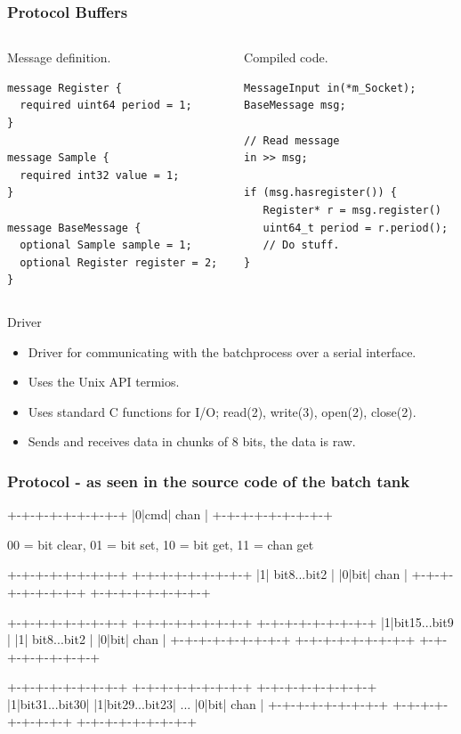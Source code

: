 \documentclass{beamer}
\begin{document}
\begin{frame}[fragile]
\frametitle{Protocol Buffers}
\begin{columns}
    \begin{column}{.5\textwidth}
    \normalsize
    Message definition.
    \footnotesize
    \begin{verbatim}
message Register {
  required uint64 period = 1;
}

message Sample {
  required int32 value = 1;
}

message BaseMessage {
  optional Sample sample = 1;
  optional Register register = 2;
}
\end{verbatim}
    \end{column}
    \begin{column}{.4\textwidth}
    \normalsize
    Compiled code.
    \footnotesize
    \begin{verbatim}
MessageInput in(*m_Socket);
BaseMessage msg;

// Read message
in >> msg;

if (msg.hasregister()) {
   Register* r = msg.register()
   uint64_t period = r.period();
   // Do stuff.
}
\end{verbatim}
    \end{column}
\end{columns}
\end{frame}


\begin{frame}{Driver}
        \begin{itemize}
            \item Driver for communicating with the batchprocess over a serial interface.
            \item Uses the Unix API termios.
            \item Uses standard C functions for I/O; read(2), write(3), open(2), close(2).
            \item Sends and receives data in chunks of 8 bits, the data is raw.   
        \end{itemize}
\end{frame}

\begin{frame}[fragile]
    \frametitle{Protocol - as seen in the source code of the batch tank}
        \small
\begin{semiverbatim}
+-+-+-+-+-+-+-+-+
|0|cmd|  chan   | 
+-+-+-+-+-+-+-+-+

00 = bit clear, 01 = bit set, 10 = bit get, 11 = chan get

+-+-+-+-+-+-+-+-+  +-+-+-+-+-+-+-+-+ 
|1| bit8...bit2 |  |0|bit|  chan   |
+-+-+-+-+-+-+-+-+  +-+-+-+-+-+-+-+-+ 

+-+-+-+-+-+-+-+-+  +-+-+-+-+-+-+-+-+  +-+-+-+-+-+-+-+-+ 
|1|bit15...bit9 |  |1| bit8...bit2 |  |0|bit|  chan   |
+-+-+-+-+-+-+-+-+  +-+-+-+-+-+-+-+-+  +-+-+-+-+-+-+-+-+ 
 
+-+-+-+-+-+-+-+-+  +-+-+-+-+-+-+-+-+     +-+-+-+-+-+-+-+-+ 
|1|bit31...bit30|  |1|bit29...bit23| ... |0|bit|  chan   |
+-+-+-+-+-+-+-+-+  +-+-+-+-+-+-+-+-+     +-+-+-+-+-+-+-+-+ 
\end{semiverbatim}
\end{frame}
\end{document}
